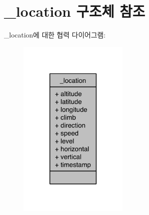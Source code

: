 \hypertarget{struct__location}{\section{\-\_\-location 구조체 참조}
\label{struct__location}
}


\-\_\-location에 대한 협력 다이어그램\-:\nopagebreak
\begin{figure}[H]
\begin{center}
\leavevmode
\includegraphics[width=150pt]{struct__location__coll__graph}
\end{center}
\end{figure}
